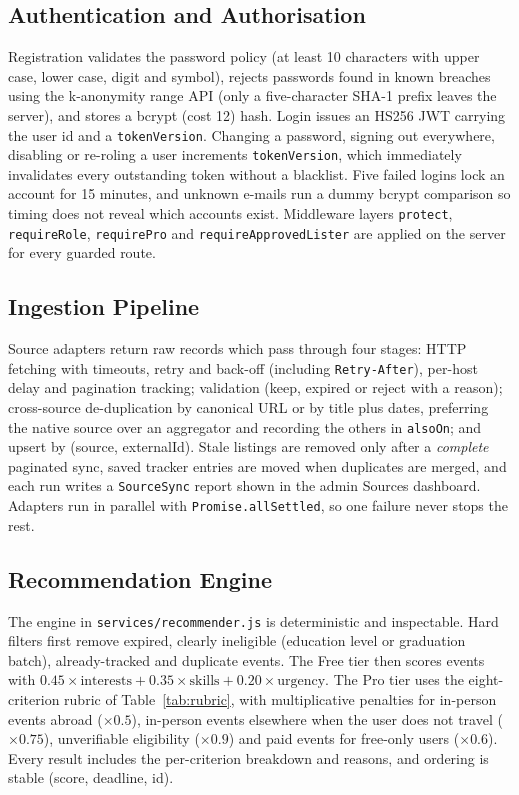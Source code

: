\documentclass[12pt,a4paper]{report}
\begin{document}
\subsection{Authentication and Authorisation}
Registration validates the password policy (at least 10 characters with upper case, lower case, digit and symbol), rejects passwords found in known breaches using the k-anonymity range API (only a five-character SHA-1 prefix leaves the server), and stores a bcrypt (cost 12) hash. Login issues an HS256 JWT carrying the user id and a \texttt{tokenVersion}. Changing a password, signing out everywhere, disabling or re-roling a user increments \texttt{tokenVersion}, which immediately invalidates every outstanding token without a blacklist. Five failed logins lock an account for 15 minutes, and unknown e-mails run a dummy bcrypt comparison so timing does not reveal which accounts exist. Middleware layers \texttt{protect}, \texttt{requireRole}, \texttt{requirePro} and \texttt{requireApprovedLister} are applied on the server for every guarded route.

\subsection{Ingestion Pipeline}
Source adapters return raw records which pass through four stages: HTTP fetching with timeouts, retry and back-off (including \texttt{Retry-After}), per-host delay and pagination tracking; validation (keep, expired or reject with a reason); cross-source de-duplication by canonical URL or by title plus dates, preferring the native source over an aggregator and recording the others in \texttt{alsoOn}; and upsert by (source, externalId). Stale listings are removed only after a \emph{complete} paginated sync, saved tracker entries are moved when duplicates are merged, and each run writes a \texttt{SourceSync} report shown in the admin Sources dashboard. Adapters run in parallel with \texttt{Promise.allSettled}, so one failure never stops the rest.

\subsection{Recommendation Engine}
The engine in \texttt{services/recommender.js} is deterministic and inspectable. Hard filters first remove expired, clearly ineligible (education level or graduation batch), already-tracked and duplicate events. The Free tier then scores events with $0.45\times\text{interests}+0.35\times\text{skills}+0.20\times\text{urgency}$. The Pro tier uses the eight-criterion rubric of Table~\ref{tab:rubric}, with multiplicative penalties for in-person events abroad ($\times0.5$), in-person events elsewhere when the user does not travel ($\times0.75$), unverifiable eligibility ($\times0.9$) and paid events for free-only users ($\times0.6$). Every result includes the per-criterion breakdown and reasons, and ordering is stable (score, deadline, id).
\end{document}
